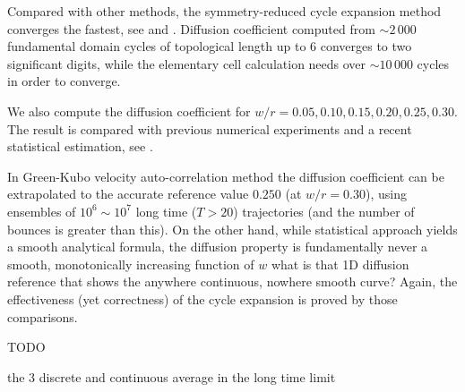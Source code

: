 Compared with other methods, the symmetry-reduced cycle expansion
method converges the fastest, see  and
. Diffusion coefficient computed from
$\sim2\,000$ fundamental domain cycles of topological length up to 6
converges to two significant digits, while the elementary cell calculation
needs over $\sim 10\,000$ cycles in order to converge.

We also compute the diffusion coefficient for $w/r = 0.05, 0.10, 0.15,
0.20, 0.25, 0.30$. The result is compared with previous
numerical experiments and a recent statistical estimation, see
.

In Green-Kubo velocity auto-correlation method the  diffusion
coefficient can be extrapolated to the accurate reference value
$0.250$ (at $w/r=0.30$), using ensembles of $10^6\sim10^7$ long time ($T>20$)
trajectories (and the number of bounces is
greater than this). On the other hand, while statistical
approach yields a smooth analytical formula, the
diffusion property is fundamentally never a smooth, monotonically
increasing function of $w$
     {what is that 1D diffusion reference that shows the
    anywhere continuous, nowhere smooth curve?}
Again, the effectiveness (yet correctness) of the cycle expansion is
proved by those comparisons.

TODO

the 3 discrete and continuous average in the long time limit
